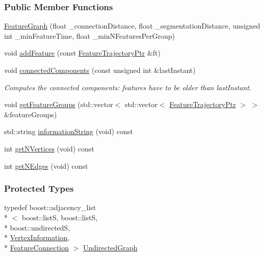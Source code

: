 \subsubsection*{Public Member Functions}
\begin{DoxyCompactItemize}
\item 
\hyperlink{classFeatureGraph_a388051116011290dbf5e8e613c3eb848}{Feature\-Graph} (float \-\_\-connection\-Distance, float \-\_\-segmentation\-Distance, unsigned int \-\_\-min\-Feature\-Time, float \-\_\-min\-N\-Features\-Per\-Group)
\item 
void \hyperlink{classFeatureGraph_a557fa8ecb18a4941e53f563b886c3183}{add\-Feature} (const \hyperlink{Motion_8hpp_a86ae4681c45e5385d5543cff332f56f4}{Feature\-Trajectory\-Ptr} \&ft)
\item 
void \hyperlink{classFeatureGraph_a4c680df72b07209db91e8582fad22d71}{connected\-Components} (const unsigned int \&last\-Instant)
\begin{DoxyCompactList}\small\item\em Computes the connected components\-: features have to be older than last\-Instant. \end{DoxyCompactList}\item 
void \hyperlink{classFeatureGraph_ac269a978791778e4bc7a481dfe44feea}{get\-Feature\-Groups} (std\-::vector$<$ std\-::vector$<$ \hyperlink{Motion_8hpp_a86ae4681c45e5385d5543cff332f56f4}{Feature\-Trajectory\-Ptr} $>$ $>$ \&feature\-Groups)
\item 
std\-::string \hyperlink{classFeatureGraph_a090d43dcf6267b05fba91357b9a96d81}{information\-String} (void) const 
\item 
int \hyperlink{classFeatureGraph_a3526d6f23cdda23bd78e286d0a04f03c}{get\-N\-Vertices} (void) const 
\item 
int \hyperlink{classFeatureGraph_a3b3582bc0f1260bff263be6ab03f2a88}{get\-N\-Edges} (void) const 
\end{DoxyCompactItemize}
\subsubsection*{Protected Types}
\begin{DoxyCompactItemize}
\item 
typedef boost\-::adjacency\-\_\-list\\*
$<$ boost\-::list\-S, boost\-::list\-S, \\*
boost\-::undirected\-S, \\*
\hyperlink{structFeatureGraph_1_1VertexInformation}{Vertex\-Information}, \\*
\hyperlink{structFeatureGraph_1_1FeatureConnection}{Feature\-Connection} $>$ \hyperlink{classFeatureGraph_a165ef4f8fdfb5cefa12f372d55d95923}{Undirected\-Graph}
\end{DoxyCompactItemize}

